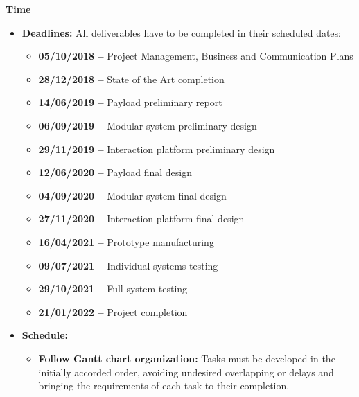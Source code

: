 \textbf{Time}

\begin{itemize}
	
	\item \textbf{Deadlines:} All deliverables have to be completed in their scheduled dates:
	
	\begin{itemize}
		
		\item \textbf{05/10/2018 – } Project Management, Business and Communication Plans
		
		\item \textbf{28/12/2018 – } State of the Art completion
		
		\item \textbf{14/06/2019 – } Payload preliminary report
		
		\item \textbf{06/09/2019 – } Modular system preliminary design
		
		\item \textbf{29/11/2019 – } Interaction platform preliminary design
		
		\item \textbf{12/06/2020 – } Payload final design
		
		\item \textbf{04/09/2020 – } Modular system final design 
		
		\item \textbf{27/11/2020 – } Interaction platform final design
		
		\item \textbf{16/04/2021 – } Prototype manufacturing
		
		\item \textbf{09/07/2021 – } Individual systems testing 
		
		\item \textbf{29/10/2021 – } Full system testing
		
		\item \textbf{21/01/2022 – } Project completion
		
	\end{itemize}
	
	\item \textbf{Schedule:}
	
	\begin{itemize}
		
		\item \textbf{Follow Gantt chart organization:} Tasks must be developed in the initially accorded order, avoiding undesired overlapping or delays and bringing the requirements of each task to their completion.
		
	\end{itemize}
	

\end{itemize}

